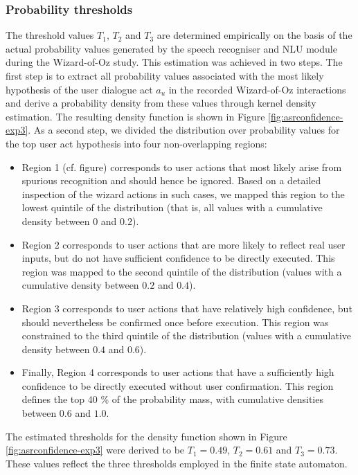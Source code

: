\subsubsection*{Probability thresholds}

The threshold values $T_1$, $T_2$ and $T_3$ are determined empirically on the basis of the actual probability values generated by the speech recogniser and NLU module during the Wizard-of-Oz study.  This estimation was achieved in two steps.  The first step is to extract all probability values associated with the most likely hypothesis of the user dialogue act $a_u$ in the recorded Wizard-of-Oz interactions and derive a probability density from these values through kernel density estimation. The resulting density function is shown in Figure \ref{fig:asrconfidence-exp3}. As a second step, we divided the distribution over probability values for the top user act hypothesis into four non-overlapping regions:
\begin{itemize}
\item Region 1 (cf. figure) corresponds to user actions that most likely arise from spurious recognition and should hence be ignored. Based on a detailed inspection of the wizard actions in such cases, we mapped this region to the lowest quintile of the distribution (that is, all values with a cumulative density between $0$ and $0.2$). 
\item Region 2 corresponds to user actions that are more likely to reflect real user inputs, but do not have sufficient confidence to be directly executed.  This region was mapped to the second quintile of the distribution (values with a cumulative density between $0.2$ and $0.4$).
\item Region 3 corresponds to user actions that have relatively high confidence, but should nevertheless be confirmed once before execution.  This region was constrained to the third quintile of the distribution (values with a cumulative density between $0.4$ and $0.6$).
\item Finally, Region 4 corresponds to user actions that have a sufficiently high confidence to be directly executed without user confirmation. This region defines the top 40 \% of the probability mass, with cumulative densities between $0.6$ and $1.0$.
\end{itemize}

The estimated thresholds for the density function shown in Figure \ref{fig:asrconfidence-exp3} were derived to be $T_1 = 0.49$, $T_2 = 0.61$ and $T_3 = 0.73$. These values reflect the three thresholds employed in the finite state automaton. 

